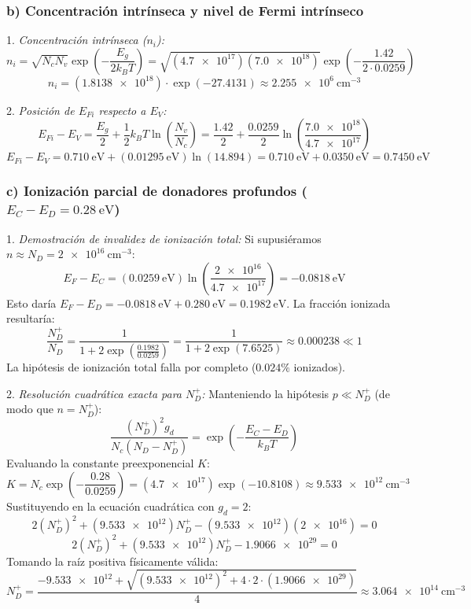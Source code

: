 \begin{problema}
\subsubsection*{b) Concentración intrínseca y nivel de Fermi intrínseco}

1. \textit{Concentración intrínseca ($n_i$):}
\[
n_i = \sqrt{N_c N_v} \exp\left( -\frac{E_g}{2 k_B T} \right) = \sqrt{(\num{4.7e17})(\num{7.0e18})} \exp\left( -\frac{1.42}{2 \cdot 0.0259} \right)
\]
\[
n_i = (\num{1.8138e18}) \cdot \exp(-27.4131) \approx \SI{2.255e6}{\cm^{-3}}
\]

2. \textit{Posición de $E_{Fi}$ respecto a $E_V$:}
\[
E_{Fi} - E_V = \frac{E_g}{2} + \frac{1}{2} k_B T \ln\left( \frac{N_v}{N_c} \right) = \frac{1.42}{2} + \frac{0.0259}{2} \ln\left( \frac{\num{7.0e18}}{\num{4.7e17}} \right)
\]
\[
E_{Fi} - E_V = \SI{0.710}{\eV} + (\SI{0.01295}{\eV}) \ln(14.894) = \SI{0.710}{\eV} + \SI{0.0350}{\eV} = \SI{0.7450}{\eV}
\]

\subsubsection*{c) Ionización parcial de donadores profundos ($E_C - E_D = \SI{0.28}{\eV}$)}

1. \textit{Demostración de invalidez de ionización total:}
Si supusiéramos $n \approx N_D = \SI{2e16}{\cm^{-3}}$:
\[
E_F - E_C = (\SI{0.0259}{\eV}) \ln\left( \frac{\num{2e16}}{\num{4.7e17}} \right) = \SI{-0.0818}{\eV}
\]
Esto daría $E_F - E_D = \SI{-0.0818}{\eV} + \SI{0.280}{\eV} = \SI{+0.1982}{\eV}$. La fracción ionizada resultaría:
\[
\frac{N_D^+}{N_D} = \frac{1}{1 + 2 \exp\left( \frac{0.1982}{0.0259} \right)} = \frac{1}{1 + 2 \exp(7.6525)} \approx \num{0.000238} \ll 1
\]
La hipótesis de ionización total falla por completo ($0.024\%$ ionizados).

2. \textit{Resolución cuadrática exacta para $N_D^+$:}
Manteniendo la hipótesis $p \ll N_D^+$ (de modo que $n = N_D^+$):
\[
\frac{(N_D^+)^2 g_d}{N_c (N_D - N_D^+)} = \exp\left( -\frac{E_C - E_D}{k_B T} \right)
\]
Evaluando la constante preexponencial $K$:
\[
K = N_c \exp\left( -\frac{0.28}{0.0259} \right) = (\num{4.7e17}) \exp(-10.8108) \approx \SI{9.533e12}{\cm^{-3}}
\]
Sustituyendo en la ecuación cuadrática con $g_d = 2$:
\[
2 (N_D^+)^2 + (\num{9.533e12}) N_D^+ - (\num{9.533e12})(\num{2e16}) = 0
\]
\[
2 (N_D^+)^2 + (\num{9.533e12}) N_D^+ - \num{1.9066e29} = 0
\]
Tomando la raíz positiva físicamente válida:
\[
N_D^+ = \frac{-\num{9.533e12} + \sqrt{(\num{9.533e12})^2 + 4 \cdot 2 \cdot (\num{1.9066e29})}}{4} \approx \SI{3.064e14}{\cm^{-3}}
\]


\end{problema}
